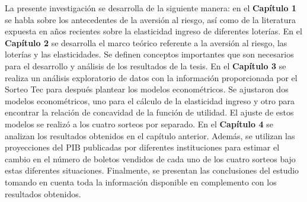 La presente investigación se desarrolla de la siguiente manera: en el \textbf{Capítulo 1} se habla sobre los antecedentes de la aversión al riesgo, así como de la literatura expuesta en años recientes sobre la elasticidad ingreso de diferentes loterías. En el \textbf{Capítulo 2} se desarrolla el marco teórico referente a la aversión al riesgo, las loterías y las elasticidades. Se definen conceptos importantes que son necesarios para el desarrollo y análisis de los resultados de la tesis. En el \textbf{Capítulo 3} se realiza un análisis exploratorio de datos con la información proporcionada por el Sorteo Tec para después plantear los modelos econométricos. Se ajustaron dos modelos econométricos, uno para el cálculo de la elasticidad ingreso y otro para encontrar la relación de concavidad de la función de utilidad. El ajuste de estos modelos se realizó a los cuatro sorteos por separado. En el \textbf{Capítulo 4} se analizan los resultados obtenidos en el capítulo anterior. Además, se utilizan las proyecciones del PIB publicadas por diferentes instituciones para estimar el cambio en el número de boletos vendidos de cada uno de los cuatro sorteos bajo estas diferentes situaciones. Finalmente, se presentan las conclusiones del estudio tomando en cuenta toda la información disponible en complemento con los resultados obtenidos.

    
    
    
